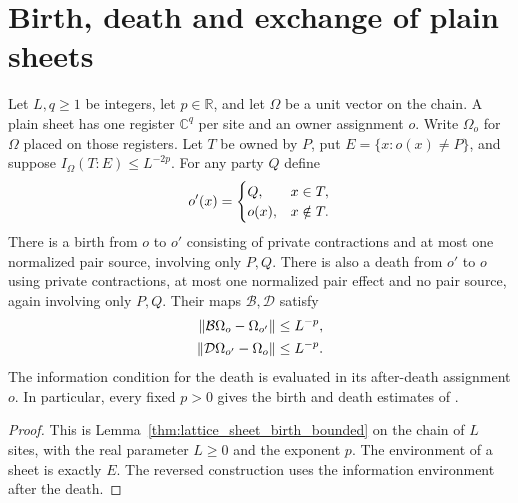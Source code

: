 \section{Birth, death and exchange of plain sheets}

\begin{lemma}
    \label{thm:chain_plain_birth_death}
    \leanok
    Let $L,q\ge1$ be integers, let $p\in\mathbb R$, and let $\Omega$ be a
    unit vector on the chain. A plain sheet has one register $\mathbb C^q$
    per site and an owner assignment $o$. Write $\Omega_o$ for $\Omega$
    placed on those registers. Let $T$ be owned by $P$, put
    $E=\{x:o(x)\ne P\}$, and suppose $I_\Omega(T:E)\le L^{-2p}$.
    For any party $Q$ define
    \begin{align}
        o'(x)=\begin{cases}
                  Q,    & x\in T,    \\
                  o(x), & x\notin T.
              \end{cases}\notag
    \end{align}
    There is a birth from $o$ to $o'$ consisting of private contractions
    and at most one normalized pair source, involving only $P,Q$.
    There is also a death from $o'$ to $o$ using private contractions,
    at most one normalized pair effect and no pair source, again involving
    only $P,Q$. Their maps $\mathcal B,\mathcal D$ satisfy
    \begin{align}
        \|\mathcal B\Omega_o-\Omega_{o'}\| & \le L^{-p},\notag \\
        \|\mathcal D\Omega_{o'}-\Omega_o\| & \le L^{-p}.\notag
    \end{align}
    The information condition for the death is evaluated in its
    after-death assignment $o$. In particular, every fixed $p>0$ gives
    the birth and death estimates of \cite[Part~II]{TNLean2026OneDimensional}.
    
\end{lemma}
\begin{proof}
    \leanok
    This is Lemma~\ref{thm:lattice_sheet_birth_bounded} on the chain of
    $L$ sites, with the real parameter $L\ge0$ and the exponent $p$. The
    environment of a sheet is exactly $E$. The reversed construction uses
    the information environment after the death.
    
\end{proof}

